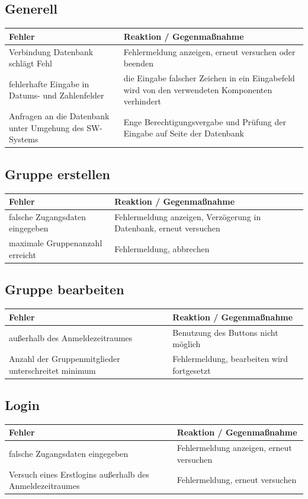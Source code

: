 \documentclass{article}
\begin{document}
\subsection{Generell}
\begin{tabular}{|p{7cm}|p{7cm}|}
\hline
	\textbf{Fehler}												&	\textbf{Reaktion / Gegenmaßnahme}						\\
\hline
\hline
	Verbindung Datenbank schlägt Fehl							&	Fehlermeldung anzeigen, erneut versuchen oder beenden	\\
\hline
	fehlerhafte Eingabe in Datums- und Zahlenfelder				&	die Eingabe falscher Zeichen in ein Eingabefeld wird von den verwendeten Komponenten verhindert	\\
\hline
	Anfragen an die Datenbank unter Umgehung des SW-Systems		&	Enge Berechtigungsvergabe und Prüfung der Eingabe auf Seite der Datenbank \\
\hline
\end{tabular}

\subsection{Gruppe erstellen}
\begin{tabular}{|p{7cm}|p{7cm}|}
\hline
	\textbf{Fehler}					&	\textbf{Reaktion / Gegenmaßnahme}									\\
\hline
\hline
	falsche Zugangsdaten eingegeben	&	Fehlermeldung anzeigen, Verzögerung in Datenbank, erneut versuchen	\\
\hline
	maximale Gruppenanzahl erreicht	&	Fehlermeldung, abbrechen											\\
\hline
\end{tabular}

\subsection{Gruppe bearbeiten}
\begin{tabular}{|p{7cm}|p{7cm}|}
\hline
	\textbf{Fehler}										&	\textbf{Reaktion / Gegenmaßnahme}				\\
\hline
\hline
	außerhalb des Anmeldezeitraumes						&	Benutzung des Buttons nicht möglich				\\
\hline
	Anzahl der Gruppenmitglieder unterschreitet minimum	&	Fehlermeldung, bearbeiten wird fortgesetzt		\\
\hline
\end{tabular}

\subsection{Login}
\begin{tabular}{|p{7cm}|p{7cm}|}
\hline
	\textbf{Fehler}												&	\textbf{Reaktion / Gegenmaßnahme}			\\
\hline
\hline
	falsche Zugangsdaten eingegeben								&	Fehlermeldung anzeigen, erneut versuchen	\\
\hline
	Versuch eines Erstlogins außerhalb des Anmeldezeitraumes	&	Fehlermeldung, erneut versuchen				\\
\hline
\end{tabular}
\end{document}
